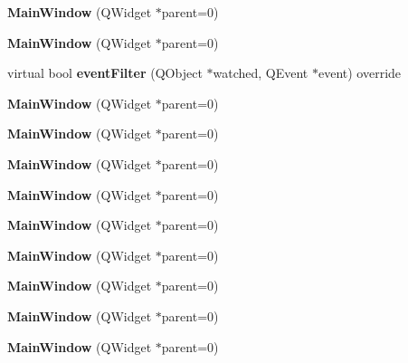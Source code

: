 \begin{DoxyCompactItemize}
{\bfseries Main\+Window} (Q\+Widget $\ast$parent=0)
\item 
\mbox{\label{class_main_window_a8b244be8b7b7db1b08de2a2acb9409db}} 
{\bfseries Main\+Window} (Q\+Widget $\ast$parent=0)
\item 
\mbox{\label{class_main_window_a0b72fa4df0e4e4ec57d3e03907373177}} 
virtual bool {\bfseries event\+Filter} (Q\+Object $\ast$watched, Q\+Event $\ast$event) override
\item 
\mbox{\label{class_main_window_a8b244be8b7b7db1b08de2a2acb9409db}} 
{\bfseries Main\+Window} (Q\+Widget $\ast$parent=0)
\item 
\mbox{\label{class_main_window_a8b244be8b7b7db1b08de2a2acb9409db}} 
{\bfseries Main\+Window} (Q\+Widget $\ast$parent=0)
\item 
\mbox{\label{class_main_window_a8b244be8b7b7db1b08de2a2acb9409db}} 
{\bfseries Main\+Window} (Q\+Widget $\ast$parent=0)
\item 
\mbox{\label{class_main_window_a8b244be8b7b7db1b08de2a2acb9409db}} 
{\bfseries Main\+Window} (Q\+Widget $\ast$parent=0)
\item 
\mbox{\label{class_main_window_a8b244be8b7b7db1b08de2a2acb9409db}} 
{\bfseries Main\+Window} (Q\+Widget $\ast$parent=0)
\item 
\mbox{\label{class_main_window_a8b244be8b7b7db1b08de2a2acb9409db}} 
{\bfseries Main\+Window} (Q\+Widget $\ast$parent=0)
\item 
\mbox{\label{class_main_window_a8b244be8b7b7db1b08de2a2acb9409db}} 
{\bfseries Main\+Window} (Q\+Widget $\ast$parent=0)
\item 
\mbox{\label{class_main_window_a8b244be8b7b7db1b08de2a2acb9409db}} 
{\bfseries Main\+Window} (Q\+Widget $\ast$parent=0)
\item 
\mbox{\label{class_main_window_a8b244be8b7b7db1b08de2a2acb9409db}} 
{\bfseries Main\+Window} (Q\+Widget $\ast$parent=0)

\end{DoxyCompactItemize}
